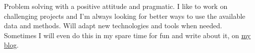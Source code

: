 

\begin{cvparagraph}

{Problem solving with a positive attitude and pragmatic. I like to work on challenging projects and I'm always looking for better ways to use the available data and methods. Will adapt new technologies and tools when needed. Sometimes I will even do this in my spare time for fun and write about it, on \underline{\href{https://bigger-tree.org}{my blog}}. 
}

\end{cvparagraph}
